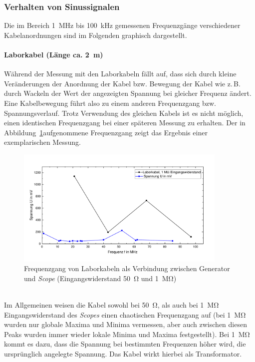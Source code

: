\documentclass[a4paper,twoside,final]{article}
\begin{document}
\subsubsection{Verhalten von Sinussignalen}
Die im Bereich \SI{1}{\mega\hertz} bis \SI{100}{\kilo\hertz} gemessenen Frequenzgänge verschiedener Kabelanordnungen sind im Folgenden graphisch dargestellt.
\paragraph{Laborkabel (Länge ca. \SI{2}{\metre})}
Während der Messung mit den Laborkabeln fällt auf, dass sich durch kleine Veränderungen der Anordnung der Kabel bzw. Bewegung der Kabel wie z.\,B. durch Wackeln der Wert der angezeigten Spannung bei gleicher Frequenz ändert. Eine Kabelbewegung führt also zu einem anderen Frequenzgang bzw. Spannungsverlauf. Trotz Verwendung des gleichen Kabels ist es nicht möglich, einen identischen Frequenzgang bei einer späteren Messung zu erhalten. Der in Abbildung~\ref{fig:Frequenzgang_Laborkabel}aufgenommene Frequenzgang zeigt das Ergebnis einer exemplarischen Messung.
\begin{figure}[htp]
    \centering
        \vspace{-0.5cm}
        \includegraphics[width=0.9\textwidth]{Bilder/Laborkabel_50_1MOhm.pdf}
        \vspace{-0.25cm}
    \caption{Frequenzgang von Laborkabeln als Verbindung zwischen Generator und \textit{Scope} (Eingangswiderstand \SI{50}{\ohm} und \SI{1}{\mega\ohm}) }
    \label{fig:Frequenzgang_Laborkabel}
\end{figure}\\
Im Allgemeinen weisen die Kabel sowohl bei \SI{50}{\ohm}, als auch bei \SI{1}{\mega\ohm} Eingangswiderstand des \textit{Scopes} einen chaotischen Frequenzgang auf (bei \SI{1}{\mega\ohm} wurden nur globale Maxima und Minima vermessen, aber auch zwischen diesen Peaks wurden immer wieder lokale Minima und Maxima festgestellt). Bei \SI{1}{\mega\ohm} kommt es dazu, dass die Spannung bei bestimmten Frequenzen höher wird, die ursprünglich angelegte Spannung. Das Kabel wirkt hierbei als Transformator.
\end{document}

